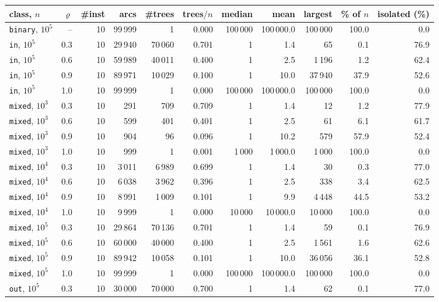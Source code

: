\begin{tabular}{@{}lrrrrrrrrrr@{}}
\toprule
class, $n$ & $\varrho$ & \#inst & arcs & \#trees & trees$/n$ & median & mean & largest & \% of $n$ & isolated (\%) \\
\midrule
\texttt{binary}, $10^5$ & -- & 10 & 99\,999 & 1 & 0.000 & 100\,000 & 100\,000.0 & 100\,000 & 100.0 & 0.0 \\
\midrule
\texttt{in}, $10^5$ & 0.3 & 10 & 29\,940 & 70\,060 & 0.701 & 1 & 1.4 & 65 & 0.1 & 76.9 \\
\texttt{in}, $10^5$ & 0.6 & 10 & 59\,989 & 40\,011 & 0.400 & 1 & 2.5 & 1\,196 & 1.2 & 62.4 \\
\texttt{in}, $10^5$ & 0.9 & 10 & 89\,971 & 10\,029 & 0.100 & 1 & 10.0 & 37\,940 & 37.9 & 52.6 \\
\texttt{in}, $10^5$ & 1.0 & 10 & 99\,999 & 1 & 0.000 & 100\,000 & 100\,000.0 & 100\,000 & 100.0 & 0.0 \\
\midrule
\texttt{mixed}, $10^3$ & 0.3 & 10 & 291 & 709 & 0.709 & 1 & 1.4 & 12 & 1.2 & 77.9 \\
\texttt{mixed}, $10^3$ & 0.6 & 10 & 599 & 401 & 0.401 & 1 & 2.5 & 61 & 6.1 & 61.7 \\
\texttt{mixed}, $10^3$ & 0.9 & 10 & 904 & 96 & 0.096 & 1 & 10.2 & 579 & 57.9 & 52.4 \\
\texttt{mixed}, $10^3$ & 1.0 & 10 & 999 & 1 & 0.001 & 1\,000 & 1\,000.0 & 1\,000 & 100.0 & 0.0 \\
\texttt{mixed}, $10^4$ & 0.3 & 10 & 3\,011 & 6\,989 & 0.699 & 1 & 1.4 & 30 & 0.3 & 77.0 \\
\texttt{mixed}, $10^4$ & 0.6 & 10 & 6\,038 & 3\,962 & 0.396 & 1 & 2.5 & 338 & 3.4 & 62.5 \\
\texttt{mixed}, $10^4$ & 0.9 & 10 & 8\,991 & 1\,009 & 0.101 & 1 & 9.9 & 4\,448 & 44.5 & 53.2 \\
\texttt{mixed}, $10^4$ & 1.0 & 10 & 9\,999 & 1 & 0.000 & 10\,000 & 10\,000.0 & 10\,000 & 100.0 & 0.0 \\
\texttt{mixed}, $10^5$ & 0.3 & 10 & 29\,864 & 70\,136 & 0.701 & 1 & 1.4 & 59 & 0.1 & 76.9 \\
\texttt{mixed}, $10^5$ & 0.6 & 10 & 60\,000 & 40\,000 & 0.400 & 1 & 2.5 & 1\,561 & 1.6 & 62.6 \\
\texttt{mixed}, $10^5$ & 0.9 & 10 & 89\,942 & 10\,058 & 0.101 & 1 & 10.0 & 36\,056 & 36.1 & 52.8 \\
\texttt{mixed}, $10^5$ & 1.0 & 10 & 99\,999 & 1 & 0.000 & 100\,000 & 100\,000.0 & 100\,000 & 100.0 & 0.0 \\
\midrule
\texttt{out}, $10^5$ & 0.3 & 10 & 30\,000 & 70\,000 & 0.700 & 1 & 1.4 & 62 & 0.1 & 77.0 \\

\end{tabular}
